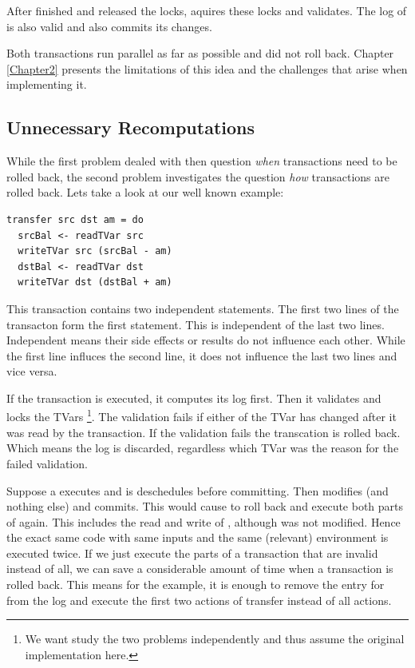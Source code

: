 After  finished and released the locks,  aquires these locks
and validates. The log of  is also valid and also commits its changes.

Both transactions run parallel as far as possible and did not roll back. Chapter \ref{Chapter2}
presents the limitations of this idea and the challenges that arise when implementing it.

\subsection{Unnecessary Recomputations}
\label{Prob:UnRe} 	
While the first problem dealed with then question \textit{when} transactions need to be rolled back,
the second problem investigates the question \textit{how} transactions are rolled back. Lets take a 
look at our well known example:
\begin{lstlisting}
transfer src dst am = do 
  srcBal <- readTVar src	
  writeTVar src (srcBal - am)	
  dstBal <- readTVar dst	
  writeTVar dst (dstBal + am)	
\end{lstlisting}
This transaction contains two independent statements. The first two lines of the transacton form the first 
statement. This is independent of the last two lines. Independent means their side effects or results do not 
influence each other. While the first line influces the second line, it does not influence the last two lines
and vice versa. 

If the transaction is executed, it computes its log first. Then it validates and locks the TVars
\footnote{We want study the two problems independently and thus assume the original implementation here.}. 
The validation fails if either of the TVar has changed after it was read by the transaction.
If the validation fails the transcation is rolled back. Which means the log is discarded,
regardless which TVar was the reason for the failed validation. 

Suppose a  executes  and is deschedules before committing.
Then  modifies  (and nothing else) and commits. This would cause 
to roll back and execute both parts of  again. This includes the read and write of , although 
 was not modified. Hence the exact same code with same inputs and the same (relevant) environment 
is executed twice. If we just execute the parts of a transaction that are invalid instead of all, we can save a 
considerable amount of time when a transaction is rolled back. This means for the example, it is enough to remove 
the entry for  from the log and execute the first two actions of transfer instead of all actions.

